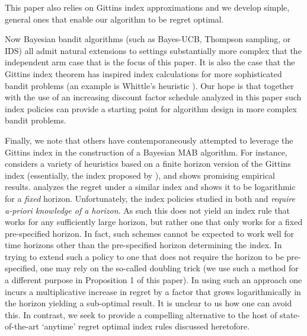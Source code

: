 This paper also relies on Gittins index approximations and we develop simple, general ones that enable our algorithm to be regret optimal. 

{\color{blue}
Now Bayesian bandit algorithms (such as Bayes-UCB, Thompson sampling, or IDS) all admit natural extensions to settings substantially more complex that the independent arm case that is the focus of this paper. It is also the case that the Gittins index theorem has inspired index calculations for more sophisticated bandit problems (an example is Whittle's heuristic  \citep{whittle1988restless}). Our hope is that together with the use of an increasing discount factor schedule analyzed in this paper such index policies can provide a starting point for algorithm design in more complex bandit problems. 
}

Finally, we note that others have contemporaneously attempted to leverage the Gittins index in the construction of a Bayesian MAB algorithm. For instance, \cite{kaufmann2016bayesian} considers a variety of heuristics based on a finite horizon version of the Gittins index (essentially, the index proposed by \cite{bradt1956sequential}), and shows promising empirical results. \cite{lattimore2016bayesregret} analyzes the regret under a similar index and shows it to be logarithmic for a {\em fixed} horizon. Unfortunately, the index policies studied in both \citep{kaufmann2016bayesian} and \citep{lattimore2016bayesregret} {\em require a-priori knowledge of a horizon}. As such this does not yield an index rule that works for any sufficiently large horizon, but rather one that only works for a fixed pre-specified horizon. In fact, such schemes cannot be expected to work well for time horizons other than the pre-specified horizon determining the index. {\color{blue} In trying to extend such a policy to one that does not require the horizon to be pre-specified, one may rely on the so-called doubling trick (we use such a method for a different purpose in Proposition 1 of this paper). In using such an approach one incurs a multiplicative increase in regret by a factor that grows logarithmically in the horizon yielding a sub-optimal result. It is unclear to us how one can avoid this. }
In contrast, we seek to provide a compelling alternative to the host of state-of-the-art `anytime' regret optimal index rules discussed heretofore. 


 


